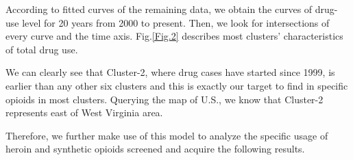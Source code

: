\documentclass[12pt]{article}
\begin{document}

According to fitted curves of the remaining data, we obtain the curves of drug-use level for 20 years from 2000 to present. Then, we look for intersections of every curve and the time axis. Fig.\ref{Fig.2} describes most clusters' characteristics of total drug use.

We can clearly see that Cluster-2, where drug cases have started since 1999, is earlier than any other six clusters and this is exactly our target to find in specific opioids in most clusters. Querying the map of U.S., we know that Cluster-2 represents east of West Virginia area.

Therefore, we further make use of this model to analyze the specific usage of heroin and synthetic opioids screened and acquire the following results.
\end{document}
